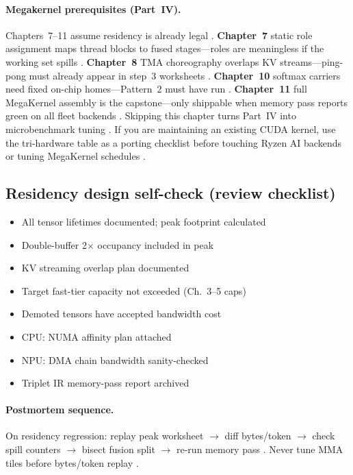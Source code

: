 \paragraph{Megakernel prerequisites (Part~IV).}
Chapters~7--11 assume residency is already legal \citep{taxbreak2026,mpk2025,wu2024mirage}.
\textbf{Chapter~7} static role assignment maps thread blocks to fused stages---roles are meaningless if the working set spills \citep{patel2025llminference,yirage2026}.
\textbf{Chapter~8} TMA choreography overlaps KV streams---ping-pong must already appear in step~3 worksheets \citep{semianalysis2024tma,dao2022flashattention}.
\textbf{Chapter~10} softmax carriers need fixed on-chip homes---Pattern~2 must have run \citep{dao2022flashattention,dao2023flashdecoding}.
\textbf{Chapter~11} full MegaKernel assembly is the capstone---only shippable when memory pass reports green on all fleet backends \citep{yirage2026,chen2020compilerbasedhardw,memoryfloor2026}.
Skipping this chapter turns Part~IV into microbenchmark tuning \citep{taxbreak2026,memoryfloor2026}.
If you are maintaining an existing CUDA kernel, use the tri-hardware table as a porting checklist before touching Ryzen AI backends or tuning MegaKernel schedules \citep{amd2024xdna,patel2025llminference,yirage2026,mpk2025}.

\subsection{Residency design self-check (review checklist)}
\begin{itemize}
\item[$\square$] All tensor lifetimes documented; peak footprint calculated
\item[$\square$] Double-buffer 2$\times$ occupancy included in peak
\item[$\square$] KV streaming overlap plan documented
\item[$\square$] Target fast-tier capacity not exceeded (Ch.~3--5 caps)
\item[$\square$] Demoted tensors have accepted bandwidth cost
\item[$\square$] CPU: NUMA affinity plan attached
\item[$\square$] NPU: DMA chain bandwidth sanity-checked
\item[$\square$] Triplet IR memory-pass report archived
\end{itemize}

\paragraph{Postmortem sequence.}
On residency regression: replay peak worksheet $\rightarrow$ diff bytes/token $\rightarrow$ check spill counters $\rightarrow$ bisect fusion split $\rightarrow$ re-run memory pass \citep{taxbreak2026,memoryfloor2026,yirage2026,patel2025llminference}.
Never tune MMA tiles before bytes/token replay \citep{nvidia2022hopper,amd2024aie}.

